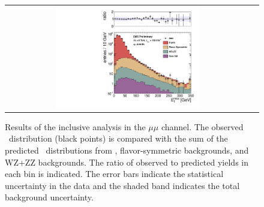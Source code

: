 \begin{table}[htb]
\begin{center}
\begin{tabular}{l|c|c|c|c|c|c}


\end{tabular}
\end{center}
\end{table}

\clearpage

\begin{figure}[!h]
\begin{center}
\begin{tabular}{cc}
\includegraphics[width=0.6\textwidth]{plots/pfmet_mm_19p5fb.pdf}
\end{tabular}
\caption{Results of the inclusive analysis in the $\mu\mu$ channel. The observed \MET\ distribution (black points) is compared with the sum of the predicted \MET\
distributions from \zjets, flavor-symmetric backgrounds, and WZ+ZZ backgrounds. The ratio of observed to predicted yields in each bin is
indicated. The error bars indicate the statistical uncertainty in the data and the shaded band indicates the total background uncertainty.
\label{fig:results_incl_mm}
}
\end{center}
\end{figure}

